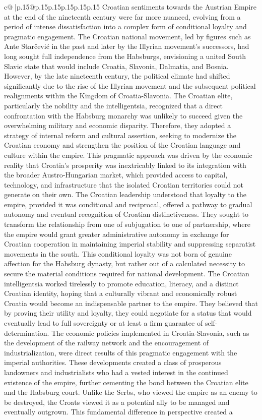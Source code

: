 \documentclass{article}
\begin{document}
{\begin{supertabular}{c@{$\;$}|p{.15\linewidth}@{}p{.15\linewidth}p{.15\linewidth}p{.15\linewidth}p{.15\linewidth}p{.15\linewidth}}
{{{Croatian sentiments towards the Austrian Empire at the end of the nineteenth century were far more nuanced, evolving from a period of intense dissatisfaction into a complex form of conditional loyalty and pragmatic engagement. The Croatian national movement, led by figures such as Ante Starčević in the past and later by the Illyrian movement's successors, had long sought full independence from the Habsburgs, envisioning a united South Slavic state that would include Croatia, Slavonia, Dalmatia, and Bosnia. However, by the late nineteenth century, the political climate had shifted significantly due to the rise of the Illyrian movement and the subsequent political realignments within the Kingdom of Croatia{-}Slavonia. The Croatian elite, particularly the nobility and the intelligentsia, recognized that a direct confrontation with the Habsburg monarchy was unlikely to succeed given the overwhelming military and economic disparity. Therefore, they adopted a strategy of internal reform and cultural assertion, seeking to modernize the Croatian economy and strengthen the position of the Croatian language and culture within the empire. This pragmatic approach was driven by the economic reality that Croatia's prosperity was inextricably linked to its integration with the broader Austro{-}Hungarian market, which provided access to capital, technology, and infrastructure that the isolated Croatian territories could not generate on their own. The Croatian leadership understood that loyalty to the empire, provided it was conditional and reciprocal, offered a pathway to gradual autonomy and eventual recognition of Croatian distinctiveness. They sought to transform the relationship from one of subjugation to one of partnership, where the empire would grant greater administrative autonomy in exchange for Croatian cooperation in maintaining imperial stability and suppressing separatist movements in the south. This conditional loyalty was not born of genuine affection for the Habsburg dynasty, but rather out of a calculated necessity to secure the material conditions required for national development. The Croatian intelligentsia worked tirelessly to promote education, literacy, and a distinct Croatian identity, hoping that a culturally vibrant and economically robust Croatia would become an indispensable partner to the empire. They believed that by proving their utility and loyalty, they could negotiate for a status that would eventually lead to full sovereignty or at least a firm guarantee of self{-}determination. The economic policies implemented in Croatia{-}Slavonia, such as the development of the railway network and the encouragement of industrialization, were direct results of this pragmatic engagement with the imperial authorities. These developments created a class of prosperous landowners and industrialists who had a vested interest in the continued existence of the empire, further cementing the bond between the Croatian elite and the Habsburg court. Unlike the Serbs, who viewed the empire as an enemy to be destroyed, the Croats viewed it as a potential ally to be managed and eventually outgrown. This fundamental difference in perspective created a }}}
\end{supertabular}}
\end{document}
